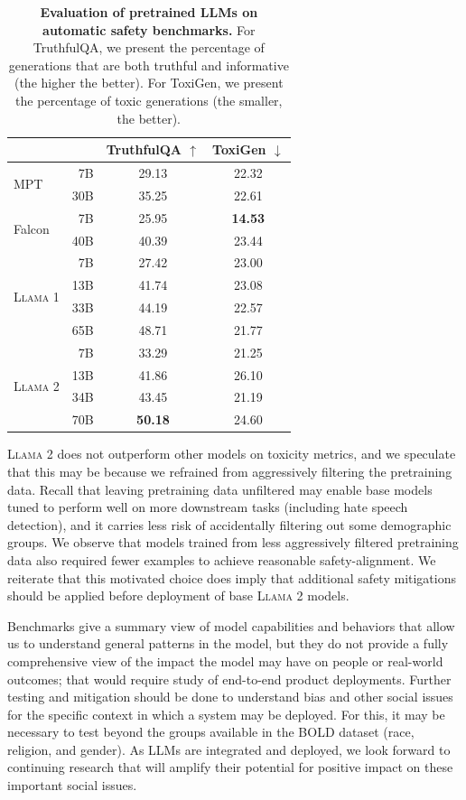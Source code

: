 \documentclass{article}
\newcommand{\anise}{\textsc{Llama 1}\xspace}
\newcommand{\cinnamon}{\textsc{Llama 2}\xspace}
\begin{document}
\begin{table}[htbp]
  \centering
  \setlength{\tabcolsep}{5pt}
  \begin{tabular}{lrcc}
  \toprule
  & & TruthfulQA $\uparrow$ & ToxiGen $\downarrow$  \\
  \midrule
  \multirow{2}{*}{MPT}
    & 7B & 29.13 & 22.32  \\
    & 30B & 35.25 & 22.61  \\
  \midrule
  \multirow{2}{*}{Falcon}
    & 7B & 25.95 & \textbf{14.53}  \\
    & 40B & 40.39 & 23.44  \\
  \midrule      
  \multirow{4}{*}{\anise}
    & 7B & 27.42 & 23.00  \\
    & 13B & 41.74 & 23.08  \\
    & 33B & 44.19 & 22.57  \\
    & 65B & 48.71 & 21.77  \\
  \midrule
  \multirow{4}{*}{\cinnamon}
    & 7B & 33.29 & 21.25  \\
    & 13B & 41.86 & 26.10  \\
    & 34B & 43.45 & 21.19  \\
    & 70B & \textbf{50.18} & 24.60  \\
  \bottomrule
  \end{tabular}
  \caption{
  \textbf{Evaluation of pretrained LLMs on automatic safety benchmarks.} 
  For TruthfulQA, we present the percentage of generations that are both truthful and informative (the higher the better). For ToxiGen, we present the percentage of toxic generations (the smaller, the better). 
  \label{tab:safety_auto_pretrained}
  }
\end{table}

 \cinnamon does not outperform other models on toxicity metrics, and we speculate that this may be because we refrained from aggressively filtering the pretraining data. Recall that leaving pretraining data unfiltered may enable base models tuned to perform well on more downstream tasks (including hate speech detection), and it carries less risk of accidentally filtering out some demographic groups. We observe that models trained from less aggressively filtered pretraining data also required fewer examples to achieve reasonable safety-alignment. We reiterate that this motivated choice does imply that additional safety mitigations should be applied before deployment of base \cinnamon models.

Benchmarks give a summary view of model capabilities and behaviors that allow us to understand general patterns in the model, but they do not provide a fully comprehensive view of the impact the model may have on people or real-world outcomes; that would require study of end-to-end product deployments. Further testing and mitigation should be done to understand bias and other social issues for the specific context in which a system may be deployed. For this, it may be necessary to test beyond the groups available in the BOLD dataset (race, religion, and gender). As LLMs are integrated and deployed, we look forward to continuing research that will amplify their potential for positive impact on these important social issues. 
\end{document}
